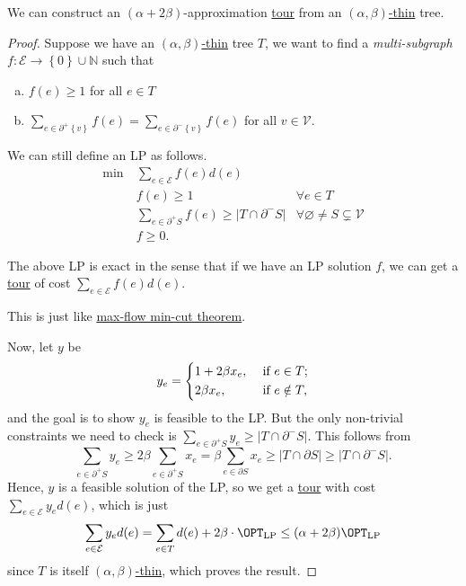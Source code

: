 \begin{lemma}\label{lma:lec11-2}
	We can construct an \((\alpha + 2\beta )\)-approximation \hyperref[def:tour]{tour} from an \hyperref[def:thin]{\((\alpha , \beta )\)-thin} tree.
\end{lemma}
\begin{proof}
	Suppose we have an \hyperref[def:thin]{\((\alpha , \beta )\)-thin} tree \(T\), we want to find a \emph{multi-subgraph} \(f\colon \mathcal{E} \to \left\{ 0 \right\} \cup \mathbb{N} \) such that
	\begin{enumerate}[(a)]
		\item \(f(e) \geq 1\) for all \(e\in T\)
		\item \(\sum_{e\in \partial ^+\left\{ v \right\} }f(e)  = \sum_{e\in \partial ^-\left\{ v \right\} } f(e)\) for all \(v\in \mathcal{V} \).
	\end{enumerate}
	We can still define an LP as follows.
	\[
		\begin{aligned}
			\min~ & \sum_{e\in \mathcal{E} }f(e) d(e)                                                                                                  \\
			      & f(e) \geq 1                                                                    & \forall e\in T                                    \\
			      & \sum_{e\in \partial ^+S} f(e) \geq \left\vert T \cap \partial ^- S \right\vert & \forall \varnothing \neq S \subsetneq \mathcal{V} \\
			      & f\geq 0.
		\end{aligned}
	\]
	\begin{claim}
		The above LP is exact in the sense that if we have an LP solution \(f\), we can get a \hyperref[def:tour]{tour} of cost \(\sum_{e\in \mathcal{E} }f(e)d(e) \).
	\end{claim}
	\begin{explanation}
		This is just like \href{https://en.wikipedia.org/wiki/Max-flow_min-cut_theorem}{max-flow min-cut theorem}.
	\end{explanation}

	Now, let \(y\) be
	\[
		y_e = \begin{dcases}
			1 + 2\beta x_e, & \text{ if } e\in T ;    \\
			2\beta x_e,     & \text{ if } e \notin T,
		\end{dcases}
	\]
	and the goal is to show \(y_e\) is feasible to the LP. But the only non-trivial constraints we need to check is \(\sum_{e\in \partial ^+ S}y_e \geq \left\vert T \cap \partial ^- S \right\vert \). This follows from
	\[
		\sum_{e\in \partial ^+ S} y_e \geq 2\beta \sum_{e\in \partial ^+ S}x_e = \beta \sum_{e\in \partial S} x_e \geq \left\vert T \cap \partial S \right\vert \geq \left\vert T \cap \partial ^- S \right\vert.
	\]
	Hence, \(y\) is a feasible solution of the LP, so we get a \hyperref[def:tour]{tour} with cost \(\sum_{e\in \mathcal{E} }y_e d(e) \), which is just
	\[
		\sum_{e\in \mathcal{E} } y_e d(e) = \sum_{e\in T} d(e) + 2\beta \cdot \OPT_{\mathrm{LP} } \leq (\alpha + 2\beta )\OPT_{\mathrm{LP} }
	\]
	since \(T\) is itself \hyperref[def:thin]{\((\alpha , \beta )\)-thin}, which proves the result.
\end{proof}

